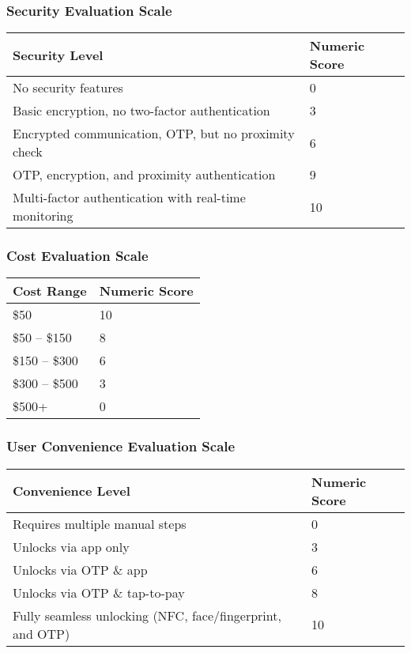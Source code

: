 
\subsubsection{Security Evaluation Scale}
\begin{tabular}{ll}
    \toprule
    Security Level & Numeric Score \\
    \midrule
    No security features & 0 \\
    Basic encryption, no two-factor authentication & 3 \\
    Encrypted communication, OTP, but no proximity check & 6 \\
    OTP, encryption, and proximity authentication & 9 \\
    Multi-factor authentication with real-time monitoring & 10 \\
    \bottomrule
\end{tabular}

\subsubsection{Cost Evaluation Scale}
\begin{tabular}{ll}
    \toprule
    Cost Range & Numeric Score \\
    \midrule
    \$50 & 10 \\
    \$50 – \$150 & 8 \\
    \$150 – \$300 & 6 \\
    \$300 – \$500 & 3 \\
    \$500+ & 0 \\
    \bottomrule
\end{tabular}

\subsubsection{User Convenience Evaluation Scale}
\begin{tabular}{ll}
    \toprule
    Convenience Level & Numeric Score \\
    \midrule
    Requires multiple manual steps & 0 \\
    Unlocks via app only & 3 \\
    Unlocks via OTP \& app & 6 \\
    Unlocks via OTP \& tap-to-pay & 8 \\
    Fully seamless unlocking (NFC, face/fingerprint, and OTP) & 10 \\
    \bottomrule
\end{tabular}

